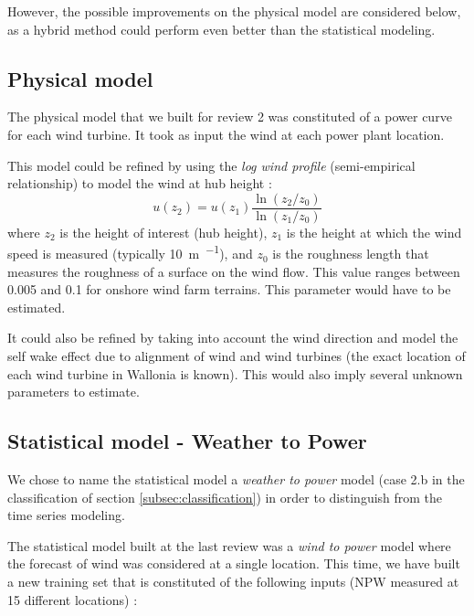 \documentclass[a4paper, 12pt]{article}
\begin{document}
    However, the possible improvements on the physical model are considered below, as a hybrid method could perform even better than the statistical modeling.

    \subsection{Physical model}
    
    The physical model that we built for review 2 was constituted of a power curve for each wind turbine. It took as input the wind at each power plant location.
    
    This model could be refined by using the \emph{log wind profile} (semi-empirical relationship) to model the wind at hub height : $$u(z_2) = u(z_1) \frac{\ln(z_2/z_0)}{\ln(z_1/z_0)}$$ where $z_2$ is the height of interest (hub height), $z_1$ is the height at which the wind speed is measured (typically \SI{10}{\meter\per{\second}}), and $z_0$ is the roughness length that measures the roughness of a surface on the wind flow. This value ranges between \num{0.005} and \num{0.1} for onshore wind farm terrains. This parameter would have to be estimated.
    
    It could also be refined by taking into account the wind direction and model the self wake effect due to alignment of wind and wind turbines (the exact location of each wind turbine in Wallonia is known). This would also imply several unknown parameters to estimate.

    \subsection{Statistical model - Weather to Power}
    
    We chose to name the statistical model a \emph{weather to power} model (case 2.b in the classification of section \ref{subsec:classification}) in order to distinguish from the time series modeling.
    
    The statistical model built at the last review was a \emph{wind to power} model where the forecast of wind was considered at a single location. This time, we have built a new training set that is constituted of the following inputs (NPW measured at 15 different locations) :
    
    
\end{document}
